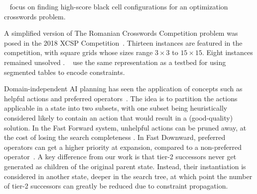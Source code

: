 \citeauthor{DBLP:conf/cig/BulitkoB21}~
focus on finding high-score black cell configurations for an optimization crosswords problem.

A simplified version of The Romanian Crosswords Competition problem was posed
in the 2018 XCSP Competition~\cite{DBLP:journals/corr/abs-1901-01830}.
Thirteen instances are featured in the competition, 
with square grids whose sizes range $3 \times 3$ to $15 \times 15$.
Eight instances remained unsolved \cite{DBLP:journals/corr/abs-1901-01830}.
\citeauthor{DBLP:conf/ecai/AudemardLM20}~
use the same representation
as a testbed for using segmented tables
to encode constraints.
%


Domain-independent AI planning has seen the application of concepts such as helpful actions
\cite{DBLP:journals/jair/HoffmannN01} and preferred operators~\cite{DBLP:journals/jair/Helmert06}.
The idea is to partition the actions applicable in a state into two subsets,
with one subset being heuristically considered likely to contain an action that would result
in a (good-quality) solution. 
In the Fast Forward system,
unhelpful actions can be pruned away,
at the cost of losing the search completeness \cite{DBLP:journals/jair/HoffmannN01}.
In Fast Downward, preferred operators can get a higher priority at expansion, 
compared to a non-preferred operator~\cite{DBLP:journals/jair/Helmert06}.
A key difference from our work is that tier-2 successors never get generated as children of the original parent state. Instead, their instantiation is considered in another state, deeper in the search tree, at which point the number of tier-2 successors can greatly be reduced due to constraint propagation.
